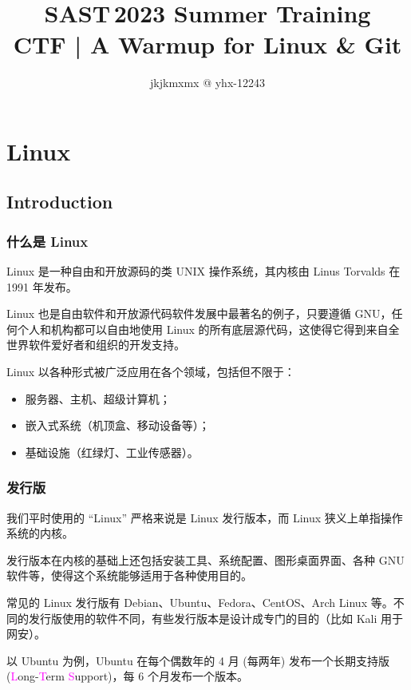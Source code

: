 \documentclass{article}
\title{SAST\,2023 Summer Training\\CTF | A Warmup for Linux \& Git}
\author{jkjkmxmx @ yhx-12243}
\begin{document}
	\maketitle
	\let\labelitemi\labelitemiii

	\section{Linux}

	\subsection{Introduction}

	\subsubsection[什么是 Linux]{什么是 Linux\protect\cite{net9-linux}}

	Linux 是一种自由和开放源码的类 UNIX 操作系统，其内核由 Linus Torvalds 在 1991 年发布。

	Linux 也是自由软件和开放源代码软件发展中最著名的例子，只要遵循 GNU，任何个人和机构都可以自由地使用 Linux 的所有底层源代码，这使得它得到来自全世界软件爱好者和组织的开发支持。

	Linux 以各种形式被广泛应用在各个领域，包括但不限于：
	\begin{itemize}
		\itemsep0pt
		\item 服务器、主机、超级计算机；
		\item 嵌入式系统（机顶盒、移动设备等）；
		\item 基础设施（红绿灯、工业传感器）。
	\end{itemize}

	\subsubsection{发行版}

	我们平时使用的 ``Linux'' 严格来说是 Linux 发行版本，而 Linux 狭义上单指操作系统的内核。

	发行版本在内核的基础上还包括安装工具、系统配置、图形桌面界面、各种 GNU 软件等，使得这个系统能够适用于各种使用目的。

	常见的 Linux 发行版有 Debian、Ubuntu、Fedora、CentOS、Arch Linux 等。不同的发行版使用的软件不同，有些发行版本是设计成专门的目的（比如 Kali 用于网安）。\cite{net9-linux}

	以 Ubuntu 为例，Ubuntu 在每个偶数年的 4 月 (每两年) 发布一个长期支持版 (\textcolor{fuchsia}Long-\textcolor{fuchsia}Term \textcolor{fuchsia}Support)，每 6 个月发布一个版本。
\end{document}
